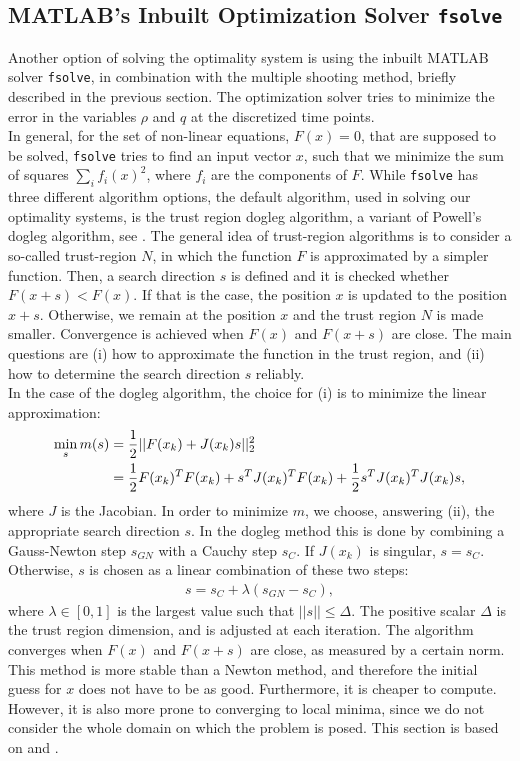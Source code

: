 \documentclass[11pt, a4paper]{article}
\theoremstyle{definition}
\newcommand{\adj}{q}
\begin{document}
\subsection{{\scshape MATLAB}'s Inbuilt Optimization Solver \texttt{fsolve}} \label{sec:fsolvedescription}
Another option of solving the optimality system is using the inbuilt {\scshape MATLAB} solver \texttt{fsolve}, in combination with the multiple shooting method, briefly described in the previous section. The optimization solver tries to minimize the error in the variables $\rho$ and $\adj$ at the discretized time points. 
\\
In general, for the set of non-linear equations, $F(x) =0$, that are supposed to be solved, \texttt{fsolve} tries to find an input vector $x$, such that we minimize the sum of squares $\sum_i f_i(x)^2$, where $f_i$ are the components of $F$. 
While \texttt{fsolve} has three different algorithm options, the default algorithm, used in solving our optimality systems, is the trust region dogleg algorithm, a variant of Powell's dogleg algorithm, see \cite{Powell1}.   
The general idea of trust-region algorithms is to consider a so-called trust-region $N$, in which the function $F$ is approximated by a simpler function. Then, a search direction $s$ is defined and it is checked whether $F(x+s) < F(x)$. If that is the case, the position $x$ is updated to the position $x+s$. Otherwise, we remain at the position $x$ and the trust region $N$ is made smaller. Convergence is achieved when $F(x)$ and $F(x+s)$ are close.
The main questions are (i) how to approximate the function in the trust region, and (ii) how to determine the search direction $s$ reliably.\\
In the case of the dogleg algorithm, the choice for (i) is to minimize the linear approximation:
\begin{align}
\label{eqn:trustregionsubprob1}
\min_s m(s) &= \frac{1}{2}|| F(x_k) + J(x_k)s||_2^2 \\
&= \frac{1}{2}F(x_k)^T F(x_k) + s^T J(x_k)^T F(x_k) + \frac{1}{2}s^T J(x_k)^TJ(x_k)s, \notag
\end{align}
where $J$ is the Jacobian.
In order to minimize $m$, we choose, answering (ii), the appropriate search direction $s$. In the dogleg method this is done by combining a Gauss-Newton step $s_{GN}$ with a Cauchy step $s_C$.
If $J(x_k)$ is singular, $s = s_C$. Otherwise, $s$ is chosen as a linear combination of these two steps:
\begin{align*}
s = s_C + \lambda(s_{GN} - s_C),
\end{align*}
where $\lambda \in [0,1]$ is the largest value such that $||s|| \leq \Delta$. The positive scalar $\Delta$ is the trust region dimension, and is adjusted at each iteration. The algorithm converges when $F(x)$ and $F(x+s)$ are close, as measured by a certain norm. 
This method is more stable than a Newton method, and therefore the initial guess for $x$ does not have to be as good. Furthermore, it is cheaper to compute. However, it is also more prone to converging to local minima, since we do not consider the whole domain on which the problem is posed.
This section is based on \cite{Powell1} and \cite{fsolve1}.
\end{document}
